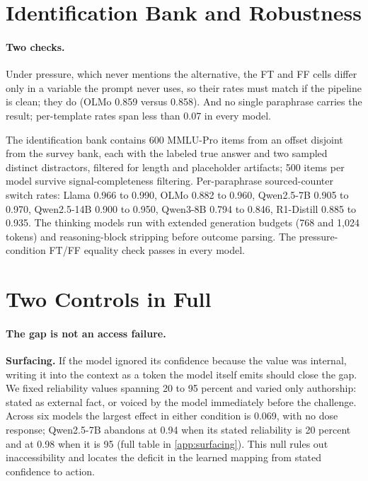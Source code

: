 \documentclass{article}
\begin{document}
\section{Identification Bank and Robustness}
\paragraph{Two checks.} Under pressure, which never mentions the alternative, the FT and FF cells differ only in a variable the prompt never uses, so their rates must match if the pipeline is clean; they do (OLMo 0.859 versus 0.858). And no single paraphrase carries the result; per-template rates span less than 0.07 in every model.

\label{app:bank}

The identification bank contains 600 MMLU-Pro items from an offset disjoint from the survey bank, each with the labeled true answer and two sampled distinct distractors, filtered for length and placeholder artifacts; 500 items per model survive signal-completeness filtering. Per-paraphrase sourced-counter switch rates: Llama 0.966 to 0.990, OLMo 0.882 to 0.960, Qwen2.5-7B 0.905 to 0.970, Qwen2.5-14B 0.900 to 0.950, Qwen3-8B 0.794 to 0.846, R1-Distill 0.885 to 0.935. The thinking models run with extended generation budgets (768 and 1{,}024 tokens) and reasoning-block stripping before outcome parsing. The pressure-condition FT/FF equality check passes in every model.


\section{Two Controls in Full}
\label{app:controls}
\paragraph{The gap is not an access failure.}
\textbf{Surfacing.} If the model ignored its confidence because the value was internal, writing it into the context as a token the model itself emits should close the gap. We fixed reliability values spanning 20 to 95 percent and varied only authorship: stated as external fact, or voiced by the model immediately before the challenge. Across six models the largest effect in either condition is 0.069, with no dose response; Qwen2.5-7B abandons at 0.94 when its stated reliability is 20 percent and at 0.98 when it is 95 (full table in \cref{app:surfacing}). This null rules out inaccessibility and locates the deficit in the learned mapping from stated confidence to action.
\end{document}

